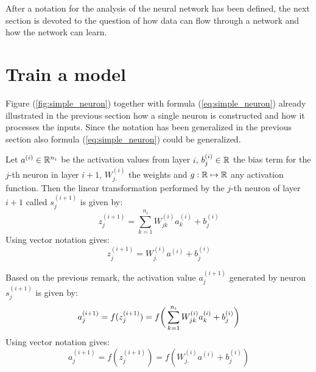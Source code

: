 After a notation for the analysis of the neural network has been defined, the next section is devoted to the question of how data can flow through a network and how the network can learn. 

\section{Train a model}

Figure (\ref{fig:simple_neuron}) together with formula (\ref{eq:simple_neuron}) already illustrated in the previous section how a single neuron is constructed and how it processes the inputs. Since the notation has been generalized in the previous section also formula (\ref{eq:simple_neuron}) could be generalized. 

\begin{remark}
	Let $a^{(i)} \in \mathbb{R}^{n_i}$ be the activation values from layer $i$, $b_j^{(i)} \in \mathbb{R}$ the bias term for the $j$-th neuron in layer $i+1$, $W_{j.}^{(i)}$ the weights and $g: \mathbb{R} \mapsto \mathbb{R}$ any activation function. Then the linear transformation performed by the $j$-th neuron of layer $i+1$ called $s_j^{(i+1)}$ is given by:
	\begin{equation}
		z_j^{(i+1)} = \sum_{k=1}^{n_i} W_{jk}^{(i)} a_k^{(i)} + b_j^{(i)}
	\end{equation}
	Using vector notation gives:
	\begin{equation}
		z_j^{(i+1)} = W_{j.}^{(i)} a^{(i)} + b_j^{(i)}
	\end{equation}	
\end{remark}

\begin{remark}
	Based on the previous remark, the activation value $a_j^{(i+1)}$ generated by neuron $s_j^{(i+1)}$ is given by: 
	\begin{equation}
		a_j^{(i+1)} = f(z_j^{(i+1)}) = f \bigg( \sum_{k=1}^{n_i} W_{jk}^{(i)} a_k^{(i)} + b_j^{(i)} \bigg) \\
	\end{equation}
	Using vector notation gives:
	\begin{equation}
		a_j^{(i+1)} = f(z_j^{(i+1)}) = f( W_{j.}^{(i)} a^{(i)} + b_j^{(i)} )
	\end{equation}	
\end{remark}
